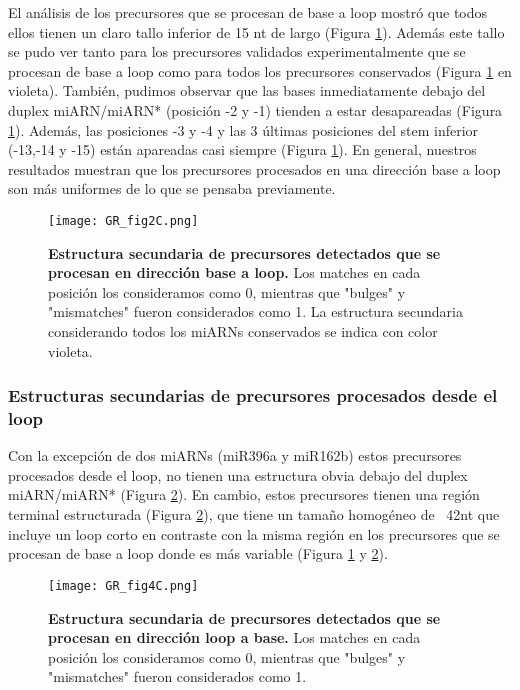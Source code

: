 El análisis de los precursores que se procesan de base a loop mostró que todos ellos tienen un claro tallo inferior de 15 nt de largo (Figura \ref{fig:GR_fig2C}).
Además este tallo se pudo ver tanto para los precursores validados experimentalmente que se procesan de base a loop como para todos los precursores conservados (Figura \ref{fig:GR_fig2C} en violeta).
También, pudimos observar que las bases inmediatamente debajo del duplex miARN/miARN* (posición -2 y -1) tienden a estar desapareadas (Figura \ref{fig:GR_fig2C}).
Además, las posiciones -3 y -4 y las 3 últimas posiciones del stem inferior (-13,-14 y -15) están apareadas casi siempre (Figura \ref{fig:GR_fig2C}).
En general, nuestros resultados muestran que los precursores procesados en una dirección base a loop son más uniformes de lo que se pensaba previamente.

\begin{figure}[htbp!] 
    \centering    
    \texttt{[image: GR\_fig2C.png]}
    \caption[Estructura secundaria de precursores de base a loop]{
    \textbf{Estructura secundaria de precursores detectados que se procesan en dirección base a loop.}
    Los matches en cada posición los consideramos como 0, mientras que "bulges" y "mismatches" fueron considerados como 1.
    La estructura secundaria considerando todos los miARNs conservados se indica con color violeta.
    }
    \label{fig:GR_fig2C}
\end{figure}

\subsubsection{Estructuras secundarias de precursores procesados desde el loop}
Con la excepción de dos miARNs (miR396a y miR162b) estos precursores procesados desde el loop, no tienen una estructura obvia debajo del duplex miARN/miARN* (Figura \ref{fig:GR_fig4C}).
En cambio, estos precursores tienen una región terminal estructurada (Figura \ref{fig:GR_fig4C}), que tiene un tamaño homogéneo de ~42nt que incluye un loop corto en contraste con la misma región en los precursores que se procesan de base a loop donde es más variable (Figura \ref{fig:GR_fig2C} y \ref{fig:GR_fig4C}). 

\begin{figure}[htbp!] 
    \centering    
    \texttt{[image: GR\_fig4C.png]}
    \caption[Estructura secundaria de precursores de loop a base]{
   \textbf{ Estructura secundaria de precursores detectados que se procesan en dirección loop a base.}
    Los matches en cada posición los consideramos como 0, mientras que "bulges" y "mismatches" fueron considerados como 1.}
    \label{fig:GR_fig4C}
\end{figure}



